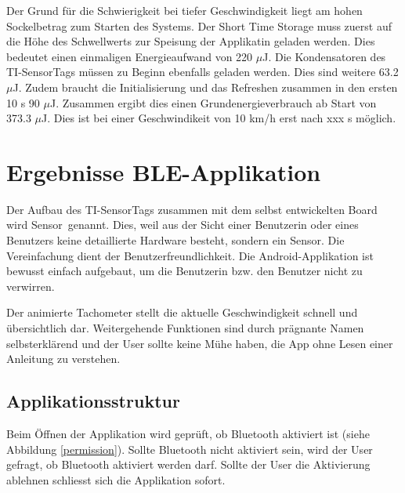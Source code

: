 Der Grund für die Schwierigkeit bei tiefer Geschwindigkeit liegt am hohen Sockelbetrag zum Starten des Systems. Der Short Time Storage muss zuerst auf die Höhe des Schwellwerts zur Speisung der Applikatin geladen werden. Dies bedeutet einen einmaligen Energieaufwand von 220 $\mu$J. Die Kondensatoren des TI-SensorTags müssen zu Beginn ebenfalls geladen werden. Dies sind weitere 63.2 $\mu$J. Zudem braucht die Initialisierung und das Refreshen zusammen in den ersten 10 s 90 $\mu$J. Zusammen ergibt dies einen Grundenergieverbrauch ab Start von 373.3 $\mu$J. Dies ist bei einer Geschwindikeit von 10 km/h erst nach xxx s möglich.





\newpage
\section{Ergebnisse BLE-Applikation}

Der Aufbau des TI-SensorTags zusammen mit dem selbst entwickelten Board wird \glqq Sensor\grqq\thinspace\ genannt. Dies, weil aus der Sicht einer Benutzerin oder eines Benutzers keine detaillierte Hardware besteht, sondern \glqq ein Sensor\grqq. Die Vereinfachung dient der Benutzerfreundlichkeit. Die Android-Applikation ist bewusst einfach aufgebaut, um die Benutzerin bzw. den Benutzer nicht zu verwirren. 

Der animierte Tachometer stellt die aktuelle Geschwindigkeit schnell und übersichtlich dar. Weitergehende Funktionen sind durch prägnante Namen selbsterklärend und der User sollte keine Mühe haben, die App ohne Lesen einer Anleitung zu verstehen.

\subsection{Applikationsstruktur}

Beim Öffnen der Applikation wird geprüft, ob Bluetooth aktiviert ist (siehe Abbildung \ref{permission}). Sollte Bluetooth nicht aktiviert sein, wird der User gefragt, ob Bluetooth aktiviert werden darf. Sollte der User die Aktivierung ablehnen schliesst sich die Applikation sofort.

